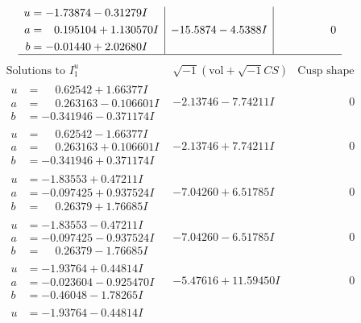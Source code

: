 \documentclass[1p]{elsarticle_modified}
\theoremstyle{definition}
\newcommand{\I}{\sqrt{-1}}
\begin{document}
$$\begin{array}{c|c|c}
\begin{aligned}
u &= -1.73874 - 0.31279 I \\
a &= \phantom{-}0.195104 + 1.130570 I \\
b &= -0.01440 + 2.02680 I\end{aligned}
 & -15.5874 - 4.5388 I & \phantom{-0.000000 } 0\\
 \hline 
 \end{array}$$\newpage$$\begin{array}{c|c|c}  
\text{Solutions to }I^u_{1}& \I (\text{vol} + \sqrt{-1}CS) & \text{Cusp shape}\\
 \hline 
\begin{aligned}
u &= \phantom{-}0.62542 + 1.66377 I \\
a &= \phantom{-}0.263163 - 0.106601 I \\
b &= -0.341946 - 0.371174 I\end{aligned}
 & -2.13746 - 7.74211 I & \phantom{-0.000000 } 0 \\ \hline\begin{aligned}
u &= \phantom{-}0.62542 - 1.66377 I \\
a &= \phantom{-}0.263163 + 0.106601 I \\
b &= -0.341946 + 0.371174 I\end{aligned}
 & -2.13746 + 7.74211 I & \phantom{-0.000000 } 0 \\ \hline\begin{aligned}
u &= -1.83553 + 0.47211 I \\
a &= -0.097425 + 0.937524 I \\
b &= \phantom{-}0.26379 + 1.76685 I\end{aligned}
 & -7.04260 + 6.51785 I & \phantom{-0.000000 } 0 \\ \hline\begin{aligned}
u &= -1.83553 - 0.47211 I \\
a &= -0.097425 - 0.937524 I \\
b &= \phantom{-}0.26379 - 1.76685 I\end{aligned}
 & -7.04260 - 6.51785 I & \phantom{-0.000000 } 0 \\ \hline\begin{aligned}
u &= -1.93764 + 0.44814 I \\
a &= -0.023604 - 0.925470 I \\
b &= -0.46048 - 1.78265 I\end{aligned}
 & -5.47616 + 11.59450 I & \phantom{-0.000000 } 0 \\ \hline\begin{aligned}
u &= -1.93764 - 0.44814 I \\

\end{aligned}
\end{array}$$
\end{document}
